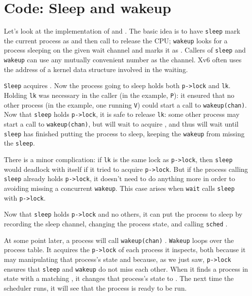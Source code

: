 \section{Code: Sleep and wakeup}

Let's look at the implementation of
and
.
The basic idea is to have
\lstinline{sleep}
mark the current process as
and then call
to release the CPU;
\lstinline{wakeup}
looks for a process sleeping on the given wait channel
and marks it as 
.
Callers of
\lstinline{sleep}
and
\lstinline{wakeup}
can use any mutually convenient number as the channel.
Xv6 often uses the address
of a kernel data structure involved in the waiting.

\lstinline{Sleep}
acquires 
.
Now the process going to sleep holds both
\lstinline{p->lock}
and
\lstinline{lk}.
Holding
\lstinline{lk}
was necessary in the caller (in the example,
\lstinline{P}):
it
ensured that no other process (in the example,
one running
\lstinline{V})
could start a call to
\lstinline{wakeup(chan)}.
Now that
\lstinline{sleep}
holds
\lstinline{p->lock},
it is safe to release
\lstinline{lk}:
some other process may start a call to
\lstinline{wakeup(chan)},
but
will wait to acquire
,
and thus will wait until
\lstinline{sleep}
has finished putting the process to sleep,
keeping the
\lstinline{wakeup}
from missing the
\lstinline{sleep}.

There is a minor complication: if 
\lstinline{lk}
is the same lock as
\lstinline{p->lock},
then
\lstinline{sleep}
would deadlock with itself if it tried to acquire 
\lstinline{p->lock}.
But if the process calling
\lstinline{sleep}
already holds \lstinline{p->lock}, it
doesn't need to do anything more in order
to avoiding missing a concurrent \lstinline{wakeup}.
This case arises when
\lstinline{wait}
calls
\lstinline{sleep}
with 
\lstinline{p->lock}.

Now that
\lstinline{sleep}
holds
\lstinline{p->lock}
and no others,
it can put the process to sleep by recording
the sleep channel,
changing the process state,
and calling
\lstinline{sched}
.

At some point later, a process will call
\lstinline{wakeup(chan)}
.
\lstinline{Wakeup}
loops over the process table.
It acquires the
\lstinline{p->lock}
of each process it inspects,
both because it may manipulating that process's state
and because, as we just saw,
\lstinline{p->lock}
ensures that
\lstinline{sleep}
and
\lstinline{wakeup}
do not miss each other.
When it finds a process in state
with a matching
,
it changes that process's state to
.
The next time the scheduler runs, it will
see that the process is ready to be run.

